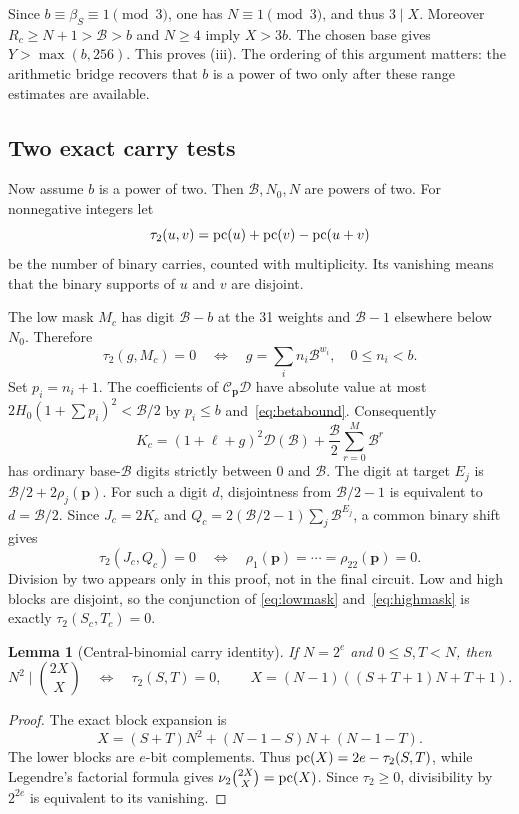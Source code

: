 \documentclass[11pt,letterpaper]{article}
\newtheorem{lemma}[theorem]{Lemma}
\theoremstyle{definition}\newtheorem{definition}[theorem]{Definition}
\newcommand{\BB}{\mathcal B}\newcommand{\Dc}{\mathcal D}\newcommand{\Ccap}{\mathcal C}
\begin{document}
Since $b\equiv\beta_S\equiv1\pmod3$, one has $N\equiv1\pmod3$,
and thus $3\mid X$. Moreover $R_c\ge N+1>\BB>b$ and $N\ge4$ imply
$X>3b$. The chosen base gives $Y>\max(b,256)$. This proves (iii).
The ordering of this argument matters: the arithmetic bridge recovers
that $b$ is a power of two only after these range estimates are available.

\subsection{Two exact carry tests}
Now assume $b$ is a power of two. Then $\BB,N_0,N$ are powers of two.
For nonnegative integers let
\[
\tau_2(u,v)=\operatorname{pc}(u)+\operatorname{pc}(v)-\operatorname{pc}(u+v)
\]
be the number of binary carries, counted with multiplicity. Its vanishing
means that the binary supports of $u$ and $v$ are disjoint.

The low mask $M_c$ has digit $\BB-b$ at the 31 weights and $\BB-1$
elsewhere below $N_0$. Therefore
\begin{equation}
\tau_2(g,M_c)=0\quad\Longleftrightarrow\quad
g=\sum_i n_i\BB^{w_i},\quad 0\le n_i<b.
\label{eq:lowmask}
\end{equation}
Set $p_i=n_i+1$. The coefficients of $\mathcal C_{\mathbf p}\Dc$ have
absolute value at most $2H_0(1+\sum p_i)^2<\BB/2$ by
$p_i\le b$ and~\eqref{eq:betabound}. Consequently
\[
K_c=(1+\ell+g)^2\Dc(\BB)+\frac{\BB}{2}\sum_{r=0}^{M}\BB^r
\]
has ordinary base-$\BB$ digits strictly between 0 and $\BB$. The digit
at target $E_j$ is $\BB/2+2\rho_j(\mathbf p)$.
For such a digit $d$, disjointness from $\BB/2-1$ is equivalent to
$d=\BB/2$. Since $J_c=2K_c$ and
$Q_c=2(\BB/2-1)\sum_j\BB^{E_j}$, a common binary shift gives
\begin{equation}
\tau_2(J_c,Q_c)=0\quad\Longleftrightarrow\quad
\rho_1(\mathbf p)=\cdots=\rho_{22}(\mathbf p)=0.
\label{eq:highmask}
\end{equation}
Division by two appears only in this proof, not in the final circuit.
Low and high blocks are disjoint, so the conjunction of
\eqref{eq:lowmask} and~\eqref{eq:highmask} is exactly
$\tau_2(S_c,T_c)=0$.

\begin{lemma}[Central-binomial carry identity]
If $N=2^e$ and $0\le S,T<N$, then
\[
N^2\mid\binom{2X}{X}\quad\Longleftrightarrow\quad\tau_2(S,T)=0,
\qquad X=(N-1)((S+T+1)N+T+1).
\]
\end{lemma}
\begin{proof}
The exact block expansion is
\[
X=(S+T)N^2+(N-1-S)N+(N-1-T).
\]
The lower blocks are $e$-bit complements. Thus
$\operatorname{pc}(X)=2e-\tau_2(S,T)$, while Legendre's factorial formula gives
$\nu_2\binom{2X}{X}=\operatorname{pc}(X)$. Since $\tau_2\ge0$, divisibility by
$2^{2e}$ is equivalent to its vanishing.
\end{proof}
\end{document}
